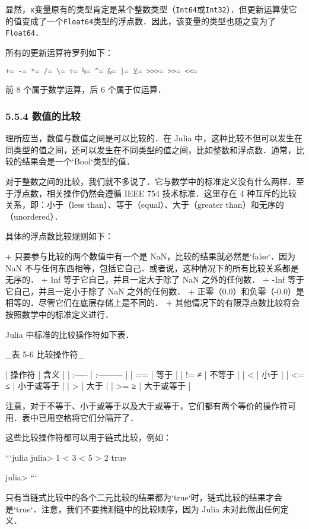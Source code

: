 显然，\verb|x|变量原有的类型肯定是某个整数类型（\verb|Int64|或\verb|Int32|）．但更新运算使它的值变成了一个\verb|Float64|类型的浮点数．因此，该变量的类型也随之变为了\verb|Float64|．

所有的更新运算符罗列如下：
\begin{lstlisting}[language=julia]
+= -= *= /= \= ÷= %= ^= &= |= ⊻= >>>= >>= <<=
\end{lstlisting}

前 8 个属于数学运算，后 6 个属于位运算．

\subsubsection{5.5.4 数值的比较}

理所应当，数值与数值之间是可以比较的．在 Julia 中，这种比较不但可以发生在同类型的值之间，还可以发生在不同类型的值之间，比如整数和浮点数．通常，比较的结果会是一个`Bool`类型的值．

对于整数之间的比较，我们就不多说了．它与数学中的标准定义没有什么两样．至于浮点数，相关操作仍然会遵循 IEEE 754 技术标准．这里存在 4 种互斥的比较关系，即：小于（less than）、等于（equal）、大于（greater than）和无序的（unordered）．

具体的浮点数比较规则如下：

+ 只要参与比较的两个数值中有一个是 NaN，比较的结果就必然是`false`．因为 NaN 不与任何东西相等，包括它自己．或者说，这种情况下的所有比较关系都是无序的．
+ Inf 等于它自己，并且一定大于除了 NaN 之外的任何数．
+ -Inf 等于它自己，并且一定小于除了 NaN 之外的任何数．
+ 正零（0.0）和负零（-0.0）是相等的．尽管它们在底层存储上是不同的．
+ 其他情况下的有限浮点数比较将会按照数学中的标准定义进行．

Julia 中标准的比较操作符如下表．

_表 5-6 比较操作符_

| 操作符 | 含义       |
| :----- | :--------- |
| ==     | 等于       |
| != ≠   | 不等于     |
| <      | 小于       |
| <= ≤   | 小于或等于 |
| >      | 大于       |
| >= ≥   | 大于或等于 |

注意，对于不等于、小于或等于以及大于或等于，它们都有两个等价的操作符可用．表中已用空格将它们分隔开了．

这些比较操作符都可以用于链式比较，例如：

```julia
julia> 1 < 3 < 5 > 2
true

julia> 
```

只有当链式比较中的各个二元比较的结果都为`true`时，链式比较的结果才会是`true`．注意，我们不要揣测链中的比较顺序，因为 Julia 未对此做出任何定义．

